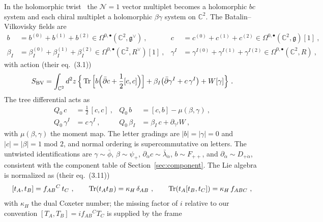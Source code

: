 In the holomorphic twist~\cite{BK,Costello} the $\mathcal N=1$ vector
multiplet becomes a holomorphic $bc$ system and each chiral multiplet a
holomorphic $\beta\gamma$ system on $\mathbb C^{2}$. The Batalin--Vilkovisky
fields are
\begin{equation}\label{eq:ht:fields}
\begin{aligned}
b &= b^{(0)}+b^{(1)}+b^{(2)} \in
\Omega^{0,\bullet}(\mathbb C^{2},\mathfrak g^{\vee}) \ , &
c &= c^{(0)}+c^{(1)}+c^{(2)} \in
\Omega^{0,\bullet}(\mathbb C^{2},\mathfrak g)[1] \ , \\
\beta_{I} &= \beta_{I}^{(0)}+\beta_{I}^{(1)}+\beta_{I}^{(2)} \in
\Omega^{0,\bullet}(\mathbb C^{2},R^{\vee})[1] \ , &
\gamma^{I} &= \gamma^{I(0)}+\gamma^{I(1)}+\gamma^{I(2)} \in
\Omega^{0,\bullet}(\mathbb C^{2},R) \ ,
\end{aligned}
\end{equation}
with action (their eq.~(3.1))
\begin{equation}\label{eq:ht:action}
S_{\mathrm{BV}}=\int_{\mathbb C^{2}}d^{2}z\,
\Big\{\operatorname{Tr}\Big[b\Big(\bar\partial c+\frac12[c,c]\Big)\Big]
+\beta_{I}\big(\bar\partial\gamma^{I}+c\,\gamma^{I}\big)
+W[\gamma]\Big\} \ .
\end{equation}
The tree differential acts as
\begin{equation}\label{eq:ht:Q0fields}
\begin{aligned}
Q_{0}\,c &= \frac12\,[c,c] \ , &
Q_{0}\,b &= [c,b]-\mu(\beta,\gamma) \ , \\
Q_{0}\,\gamma^{I} &= c\,\gamma^{I} \ , &
Q_{0}\,\beta_{I} &= \beta_{I}\,c+\partial_{\gamma^{I}}W \ ,
\end{aligned}
\end{equation}
with $\mu(\beta,\gamma)$ the moment map. The letter gradings are
$|b|=|\gamma|=0$ and $|c|=|\beta|=1$ mod $2$, and normal ordering is
supercommutative on letters. The untwisted identifications are
$\gamma\sim\bar\phi$, $\beta\sim\psi_{+}$,
$\partial_{\dot\alpha}c\sim\bar\lambda_{\dot\alpha}$, $b\sim F_{++}$, and
$\partial_{\dot\alpha}\sim D_{+\dot\alpha}$, consistent with the component
table of Section~\ref{sec:component}. The Lie algebra is normalized as (their
eq.~(3.11))
\begin{equation}\label{eq:ht:lie}
[t_{A},t_{B}]=f_{AB}{}^{C}\,t_{C} \ ,\qquad
\operatorname{Tr}(t_{A}t_{B})=\kappa_{H}\,\delta_{AB} \ ,\qquad
\operatorname{Tr}(t_{A}[t_{B},t_{C}])=\kappa_{H}\,f_{ABC} \ ,
\end{equation}
with $\kappa_{H}$ the dual Coxeter number; the missing factor of $i$ relative
to our convention $[T_{A},T_{B}]=if_{AB}{}^{C}T_{C}$ is supplied by the frame
